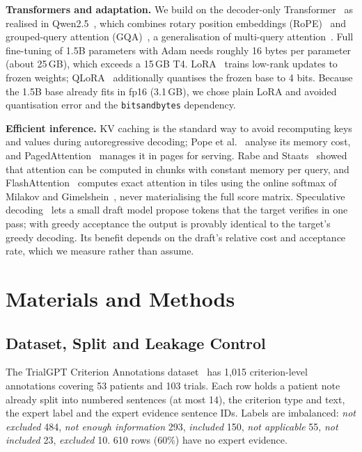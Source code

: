\documentclass[conference]{IEEEtran}
\begin{document}
\textbf{Transformers and adaptation.} We build on the decoder-only Transformer~\cite{vaswani} as realised in Qwen2.5~\cite{qwen25}, which combines rotary position embeddings (RoPE)~\cite{rope} and grouped-query attention (GQA)~\cite{gqa}, a generalisation of multi-query attention~\cite{mqa}. Full fine-tuning of 1.5B parameters with Adam needs roughly 16 bytes per parameter (about 25\,GB), which exceeds a 15\,GB T4. LoRA~\cite{lora} trains low-rank updates to frozen weights; QLoRA~\cite{qlora} additionally quantises the frozen base to 4 bits. Because the 1.5B base already fits in fp16 (3.1\,GB), we chose plain LoRA and avoided quantisation error and the \texttt{bitsandbytes} dependency.

\textbf{Efficient inference.} KV caching is the standard way to avoid recomputing keys and values during autoregressive decoding; Pope et al.~\cite{pope} analyse its memory cost, and PagedAttention~\cite{vllm} manages it in pages for serving. Rabe and Staats~\cite{rabe} showed that attention can be computed in chunks with constant memory per query, and FlashAttention~\cite{flashattn} computes exact attention in tiles using the online softmax of Milakov and Gimelshein~\cite{onlinesoftmax}, never materialising the full score matrix. Speculative decoding~\cite{leviathan,chen} lets a small draft model propose tokens that the target verifies in one pass; with greedy acceptance the output is provably identical to the target's greedy decoding. Its benefit depends on the draft's relative cost and acceptance rate, which we measure rather than assume.

\section{Materials and Methods}

\subsection{Dataset, Split and Leakage Control}
The TrialGPT Criterion Annotations dataset~\cite{trialgptdata} has 1,015 criterion-level annotations covering 53 patients and 103 trials. Each row holds a patient note already split into numbered sentences (at most 14), the criterion type and text, the expert label and the expert evidence sentence IDs. Labels are imbalanced: \emph{not excluded} 484, \emph{not enough information} 293, \emph{included} 150, \emph{not applicable} 55, \emph{not included} 23, \emph{excluded} 10. 610 rows (60\%) have no expert evidence.
\end{document}
